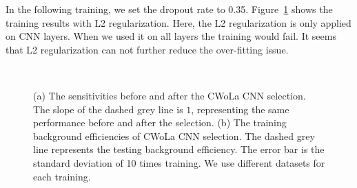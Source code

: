 \documentclass[12pt]{article}
\begin{document}
        In the following training, we set the dropout rate to 0.35. Figure~\ref{fig:sensitivity_improvement_background_pass_rate_dropout_35_CNN_l2} shows the training results with L2 regularization. Here, the L2 regularization is only applied on CNN layers. When we used it on all layers the training would fail. It seems that L2 regularization can not further reduce the over-fitting issue.
        \begin{figure}[htpb]
            \centering
             \\
            \caption{(a) The sensitivities before and after the CWoLa CNN selection. The slope of the dashed grey line is $1$, representing the same performance before and after the selection. (b) The training background efficiencies of CWoLa CNN selection. The dashed grey line represents the testing background efficiency. The error bar is the standard deviation of 10 times training. We use different datasets for each training.}
            \label{fig:sensitivity_improvement_background_pass_rate_dropout_35_CNN_l2}
        \end{figure}
\end{document}
